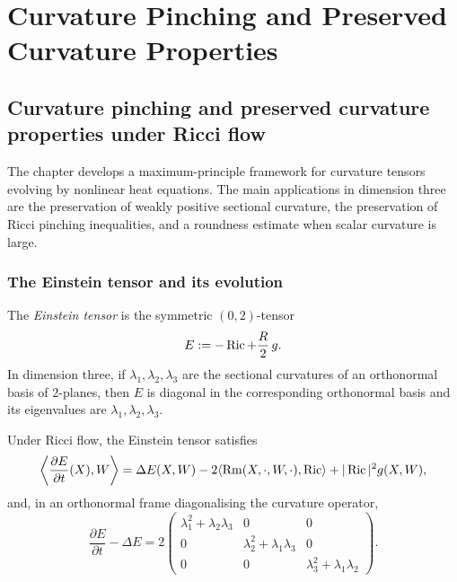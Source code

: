 \chapter{Curvature Pinching and Preserved Curvature Properties}

\section{Curvature pinching and preserved curvature properties under Ricci flow}

The chapter develops a maximum-principle framework for curvature tensors
evolving by nonlinear heat equations. The main applications in dimension three
are the preservation of weakly positive sectional curvature, the preservation
of Ricci pinching inequalities, and a roundness estimate when scalar curvature
is large.

\subsection{The Einstein tensor and its evolution}

\begin{definition}
\label{topping-ch9-einstein-tensor}
The \emph{Einstein tensor} is the symmetric \((0,2)\)-tensor
\[
E := -\operatorname{Ric} + \frac{R}{2}\,g.
\]
In dimension three, if \(\lambda_1,\lambda_2,\lambda_3\) are the sectional
curvatures of an orthonormal basis of \(2\)-planes, then \(E\) is diagonal in
the corresponding orthonormal basis and its eigenvalues are
\(\lambda_1,\lambda_2,\lambda_3\).
\end{definition}

\begin{proposition}
\label{topping-ch9-einstein-evolution}
Under Ricci flow, the Einstein tensor satisfies
\[
\left\langle \frac{\partial E}{\partial t}(X),W\right\rangle
= \Delta E(X,W)-2\langle \operatorname{Rm}(X,\cdot,W,\cdot),\operatorname{Ric}\rangle + |\operatorname{Ric}|^2 g(X,W),
\]
and, in an orthonormal frame diagonalising the curvature operator,
\[
\frac{\partial E}{\partial t}-\Delta E
= 2\begin{pmatrix}
\lambda_1^2+\lambda_2\lambda_3 & 0 & 0\\
0 & \lambda_2^2+\lambda_1\lambda_3 & 0\\
0 & 0 & \lambda_3^2+\lambda_1\lambda_2
\end{pmatrix}.
\]
\end{proposition}

